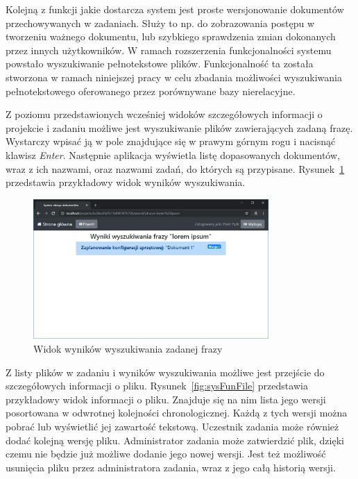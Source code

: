 Kolejną z funkcji jakie dostarcza system jest proste wersjonowanie dokumentów przechowywanych w zadaniach.
Służy to np. do zobrazowania postępu w tworzeniu ważnego dokumentu, lub szybkiego sprawdzenia zmian dokonanych przez innych użytkowników.
W ramach rozszerzenia funkcjonalności systemu powstało wyszukiwanie pełnotekstowe plików.
Funkcjonalność ta została stworzona w ramach niniejszej pracy w celu zbadania możliwości wyszukiwania pełnotekstowego oferowanego przez porównywane bazy nierelacyjne.

Z poziomu przedstawionych wcześniej widoków szczegółowych informacji o projekcie i zadaniu możliwe jest wyszukiwanie plików zawierających zadaną frazę.
Wystarczy wpisać ją w pole znajdujące się w prawym górnym rogu i nacisnąć klawisz \textit{Enter}.
Następnie aplikacja wyświetla listę dopasowanych dokumentów, wraz z ich nazwami, oraz nazwami zadań, do których są przypisane.
Rysunek~\ref{fig:sysFunSearch} przedstawia przykładowy widok wyników wyszukiwania.

\begin{figure}[!ht]
\centering
\includegraphics[width=0.8\textwidth]{figures/wyniki_wyszukiwania.JPG}
\caption{Widok wyników wyszukiwania zadanej frazy}
\label{fig:sysFunSearch}
\end{figure}

Z listy plików w zadaniu i wyników wyszukiwania możliwe jest przejście do szczegółowych informacji o pliku.
Rysunek~\ref{fig:sysFunFile} przedstawia przykładowy widok informacji o pliku.
Znajduje się na nim lista jego wersji posortowana w odwrotnej kolejności chronologicznej.
Każdą z tych wersji można pobrać lub wyświetlić jej zawartość tekstową.
Uczestnik zadania może również dodać kolejną wersję pliku.
Administrator zadania może zatwierdzić plik, dzięki czemu nie będzie już możliwe dodanie jego nowej wersji.
Jest też możliwość usunięcia pliku przez administratora zadania, wraz z jego całą historią wersji.

